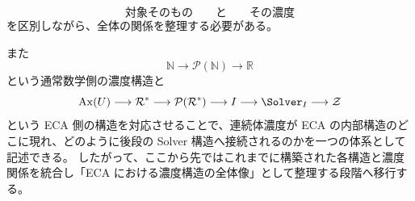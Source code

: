 \documentclass[a4paper,11pt]{article}
\begin{document}
\[
\text{対象そのもの}
\qquad\text{と}\qquad
\text{その濃度}
\]
を区別しながら、全体の関係を整理する必要がある。

また
\[
\mathbb{N}
\longrightarrow
\mathcal{P}(\mathbb{N})
\longrightarrow
\mathbb{R}
\]
という通常数学側の濃度構造と
\[
\operatorname{Ax}(U)
\longrightarrow
\mathcal{R}^*
\longrightarrow
\mathcal{P}(\mathcal{R}^*)
\longrightarrow
I
\longrightarrow
\Solver_I
\longrightarrow
\mathcal{Z}
\]
という ECA 側の構造を対応させることで、連続体濃度が ECA の内部構造のどこに現れ、どのように後段の Solver 構造へ接続されるのかを一つの体系として記述できる。
したがって、ここから先ではこれまでに構築された各構造と濃度関係を統合し「ECA における濃度構造の全体像」として整理する段階へ移行する。
\end{document}
